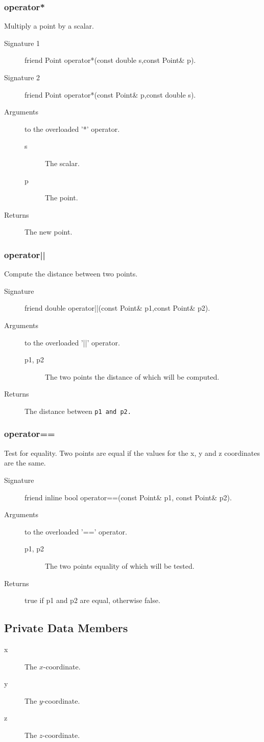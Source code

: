 \subsubsection{operator*}
Multiply a point by a scalar.
\begin{description}
  \item[Signature 1] friend Point operator*(const double s,const Point\& p).
  \item[Signature 2] friend Point operator*(const Point\& p,const double s).
  \item[Arguments]  to the overloaded '*' operator.
     \begin{description}
        \item[s] The scalar.
        \item[p] The point.
     \end{description} 
  \item[Returns] The new point.
\end{description}

\subsubsection{operator||}
Compute the distance between two points.
\begin{description}
  \item[Signature] friend double operator||(const Point\& p1,const Point\&
  p2).
  \item[Arguments]  to the overloaded '||' operator.
     \begin{description}
        \item[p1, p2] The two points the distance of which will be
  computed.
      \end{description}
  \item[Returns] The distance between \tt p1 \rm and \tt p2\rm.
\end{description}

\subsubsection{operator==}
Test for equality. Two points are equal if the values for the x, y and z 
coordinates are the same.
\begin{description}
  \item[Signature]  friend inline bool operator==(const Point\& p1,
  const Point\& p2).
    \item[Arguments]  to the overloaded '==' operator.
      \begin{description}
        \item[p1, p2] The two points equality of which will be
  tested.
      \end{description}
  \item[Returns] true if p1 and p2  are equal, otherwise false.
\end{description}

\subsection{Private Data Members}
\begin{description} 
  \item [x] The $x$-coordinate.
  \item [y] The $y$-coordinate.
  \item [z] The $z$-coordinate.
\end{description}


